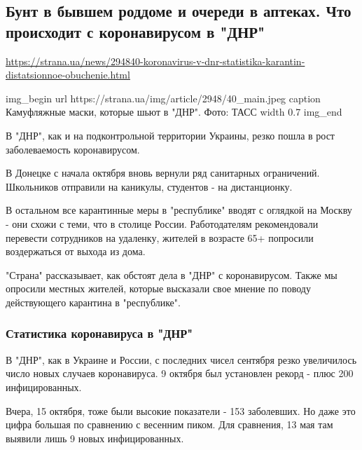  


\subsection{Бунт в бывшем роддоме и очереди в аптеках. Что происходит с коронавирусом в "ДНР"}


\url{https://strana.ua/news/294840-koronavirus-v-dnr-statistika-karantin-distatsionnoe-obuchenie.html}

\ifcmt
img_begin 
	url https://strana.ua/img/article/2948/40_main.jpeg
	caption Камуфляжные маски, которые шьют в "ДНР". Фото: ТАСС 
	width 0.7
img_end
\fi

В "ДНР", как и на подконтрольной территории Украины, резко пошла в рост
заболеваемость коронавирусом.

В Донецке с начала октября вновь вернули ряд санитарных ограничений. Школьников
отправили на каникулы, студентов - на дистанционку. 

В остальном все карантинные меры в "республике" вводят с оглядкой на Москву -
они схожи с теми, что в столице России. Работодателям рекомендовали перевести
сотрудников на удаленку, жителей в возрасте 65+ попросили воздержаться от
выхода из дома. 

"Страна" рассказывает, как обстоят дела в "ДНР" с коронавирусом. Также мы
опросили местных жителей, которые высказали свое мнение по поводу действующего
карантина в "республике". 

\subsubsection{Статистика коронавируса в "ДНР"}

В "ДНР", как в Украине и России, с последних чисел сентября резко увеличилось
число новых случаев коронавируса. 9 октября был установлен рекорд - плюс 200
инфицированных.

Вчера, 15 октября, тоже были высокие показатели - 153 заболевших. Но даже это
цифра большая по сравнению с весенним пиком. Для сравнения, 13 мая там выявили
лишь 9 новых инфицированных. 

